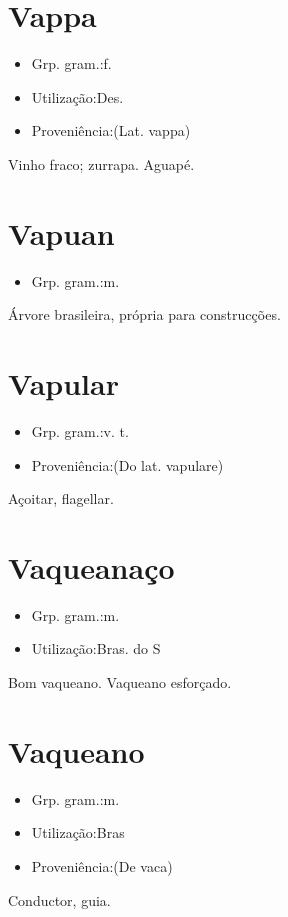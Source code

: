 \documentclass{article}
\begin{document}
\section{Vappa}
\begin{itemize}
\item {Grp. gram.:f.}
\end{itemize}
\begin{itemize}
\item {Utilização:Des.}
\end{itemize}
\begin{itemize}
\item {Proveniência:(Lat. \textunderscore vappa\textunderscore )}
\end{itemize}
Vinho fraco; zurrapa.
Aguapé.
\section{Vapuan}
\begin{itemize}
\item {Grp. gram.:m.}
\end{itemize}
Árvore brasileira, própria para construcções.
\section{Vapular}
\begin{itemize}
\item {Grp. gram.:v. t.}
\end{itemize}
\begin{itemize}
\item {Proveniência:(Do lat. \textunderscore vapulare\textunderscore )}
\end{itemize}
Açoitar, flagellar.
\section{Vaqueanaço}
\begin{itemize}
\item {Grp. gram.:m.}
\end{itemize}
\begin{itemize}
\item {Utilização:Bras. do S}
\end{itemize}
Bom vaqueano.
Vaqueano esforçado.
\section{Vaqueano}
\begin{itemize}
\item {Grp. gram.:m.}
\end{itemize}
\begin{itemize}
\item {Utilização:Bras}
\end{itemize}
\begin{itemize}
\item {Proveniência:(De \textunderscore vaca\textunderscore )}
\end{itemize}
Conductor, guia.
\end{document}
